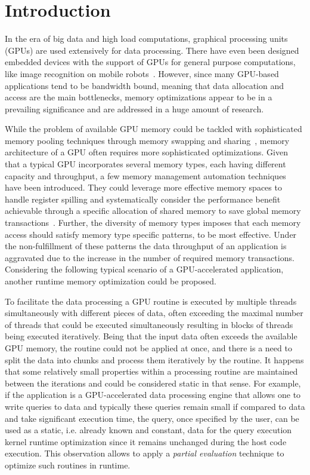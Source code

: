 \section*{Introduction}\label{sec:introduction}
In the era of big data and high load computations, graphical processing units (GPUs) are used extensively for data processing. There have even been designed embedded devices with the support of GPUs for general purpose computations, like image recognition on mobile robots~\cite{NVJETSON}. However, since many GPU-based applications tend to be bandwidth bound, meaning that data allocation and access are the main bottlenecks, memory optimizations appear to be in a prevailing significance and are addressed in a huge amount of research.

While the problem of available GPU memory could be tackled with sophisticated memory pooling techniques through memory swapping and sharing~\cite{zhang2019efficient}, memory architecture of a GPU often requires more sophisticated optimizations. Given that a typical GPU incorporates several memory types, each having different capacity and throughput, a few memory management automation techniques have been introduced. They could leverage more effective memory spaces to handle register spilling and systematically consider the performance benefit achievable through a specific allocation of shared memory to save global memory transactions~\cite{AutomaticSharedMem,RegisterSpilling}. Further, the diversity of memory types imposes that each memory access should satisfy memory type specific patterns, to be most effective. Under the non-fulfillment of these patterns the data throughput of an application is aggravated due to the increase in the number of required memory transactions. Considering the following typical scenario of a GPU-accelerated application, another runtime memory optimization could be proposed.

 To facilitate the data processing a GPU routine is executed by multiple threads simultaneously with different pieces of data, often exceeding the maximal number of threads that could be executed simultaneously resulting in blocks of threads being executed iteratively.
 Being that the input data often exceeds the available GPU memory, the routine could not be applied at once, and there is a need to split the data into chunks and process them iteratively by the routine.
 It happens that some relatively small properties within a processing routine are maintained between the iterations and could be considered static in that sense.
 For example, if the application is a GPU-accelerated data processing engine that allows one to write queries to data and typically these queries remain small if compared to data and take significant execution time, the query, once specified by the user, can be used as a static, i.e. already known and constant, data for the query execution kernel runtime optimization since it remains unchanged during the host code execution.
 This observation allows to apply a \textit{partial evaluation} technique to optimize such routines in runtime.

